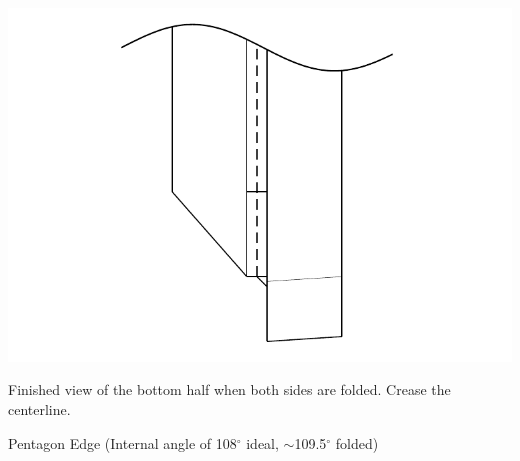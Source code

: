 \documentclass[11pt]{article}
\begin{document}
\vspace*{0.5in}

\begin{minipage}[t]{0.45\textwidth}
  \includegraphics[width=\textwidth]{../figs/fig04-08}
  \begin{itemize}{\item[8.] Finished view of the bottom half when both sides are folded.  Crease the centerline.}\end{itemize}
\end{minipage}

\newpage
{\Large Pentagon Edge}  (Internal angle of 108$^\circ$ ideal, $\sim$109.5$^\circ$ folded)
\vspace*{0.25in}
\end{document}
